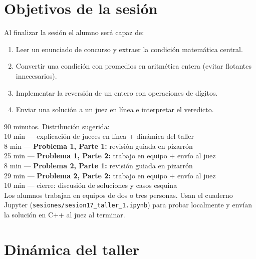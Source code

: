 \documentclass[12pt, oneside]{article}
\begin{document}

\tableofcontents
\newpage

\section{Objetivos de la sesión}

Al finalizar la sesión el alumno será capaz de:

\begin{enumerate}
  \item Leer un enunciado de concurso y extraer la condición matemática central.
  \item Convertir una condición con promedios en aritmética entera
        (evitar flotantes innecesarios).
  \item Implementar la reversión de un entero con operaciones de dígitos.
  \item Enviar una solución a un juez en línea e interpretar el veredicto.
\end{enumerate}

\begin{notaprofesor}
  90 minutos.  Distribución sugerida:\\
  10 min — explicación de jueces en línea + dinámica del taller \\
  \phantom{00} 8 min — \textbf{Problema 1, Parte 1:} revisión guiada en pizarrón \\
  \phantom{00}25 min — \textbf{Problema 1, Parte 2:} trabajo en equipo + envío al juez \\
  \phantom{00} 8 min — \textbf{Problema 2, Parte 1:} revisión guiada en pizarrón \\
  \phantom{00}29 min — \textbf{Problema 2, Parte 2:} trabajo en equipo + envío al juez \\
  10 min — cierre: discusión de soluciones y casos esquina \\[4pt]
  Los alumnos trabajan en equipos de dos o tres personas.  Usan el
  cuaderno Jupyter (\texttt{sesiones/sesion17\_taller\_1.ipynb}) para
  probar localmente y envían la solución en C++ al juez al terminar.
\end{notaprofesor}

\section{Dinámica del taller}
\end{document}
